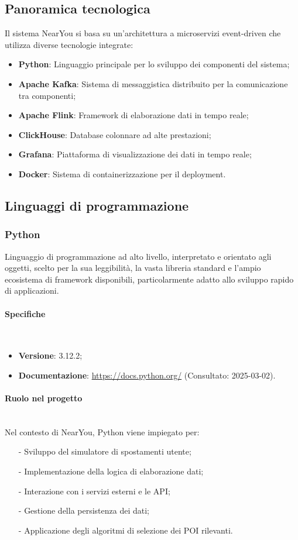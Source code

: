 \documentclass[10pt]{article}
\newcommand{\myparagraph}[1]{\paragraph{#1}\mbox{}\\}
\begin{document}
\subsection{Panoramica tecnologica}
Il sistema NearYou si basa su un'architettura a microservizi event-driven che utilizza diverse tecnologie integrate:

\begin{itemize}
    \item \textbf{Python}: Linguaggio principale per lo sviluppo dei componenti del sistema;
    \item \textbf{Apache Kafka}: Sistema di messaggistica distribuito per la comunicazione tra componenti;
    \item \textbf{Apache Flink}: Framework di elaborazione dati in tempo reale;
    \item \textbf{ClickHouse}: Database colonnare ad alte prestazioni;
    \item \textbf{Grafana}: Piattaforma di visualizzazione dei dati in tempo reale;
    \item \textbf{Docker}: Sistema di containerizzazione per il deployment.
\end{itemize}

\subsection{Linguaggi di programmazione}
\label{sec:linguaggi}

\subsubsection{Python}
Linguaggio di programmazione ad alto livello, interpretato e orientato agli oggetti, scelto per la sua leggibilità, la vasta libreria standard e l'ampio ecosistema di framework disponibili, particolarmente adatto allo sviluppo rapido di applicazioni.

\myparagraph{Specifiche}
\begin{itemize}
    \item \textbf{Versione}: 3.12.2;
    \item \textbf{Documentazione}: \textcolor{blue}{\url{https://docs.python.org/}} (Consultato: 2025-03-02).
\end{itemize}

\myparagraph{Ruolo nel progetto}
Nel contesto di NearYou, Python viene impiegato per:
\begin{itemize}
    \item[-] Sviluppo del simulatore di spostamenti utente;
    \item[-] Implementazione della logica di elaborazione dati;
    \item[-] Interazione con i servizi esterni e le API;
    \item[-] Gestione della persistenza dei dati;
    \item[-] Applicazione degli algoritmi di selezione dei POI rilevanti.
\end{itemize}
\end{document}

